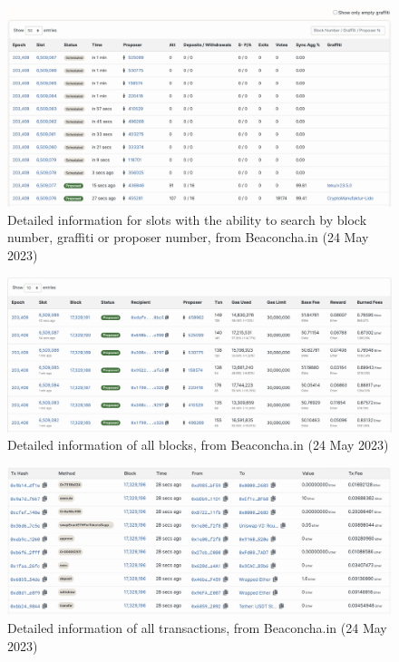 \documentclass[UTF8]{article}
\begin{document}
\begin{figure}[htbp]
\begin{center}
\includegraphics[width=0.9\linewidth]{images/bslots}
\caption{Detailed information for slots with the ability to search by block number, graffiti or proposer number, from Beaconcha.in (24 May 2023)}
\label{fig:bslots}
\end{center}
\end{figure}

\begin{figure}[htbp]
\begin{center}
\includegraphics[width=0.9\linewidth]{images/bblocks}
\caption{Detailed information of all blocks, from Beaconcha.in (24 May 2023)}
\label{fig:bblocks}
\end{center}
\end{figure}

\begin{figure}[htbp]
\begin{center}
\includegraphics[width=0.9\linewidth]{images/btxns}
\caption{Detailed information of all transactions, from Beaconcha.in (24 May 2023)}
\label{fig:btxns}
\end{center}
\end{figure}
\end{document}
